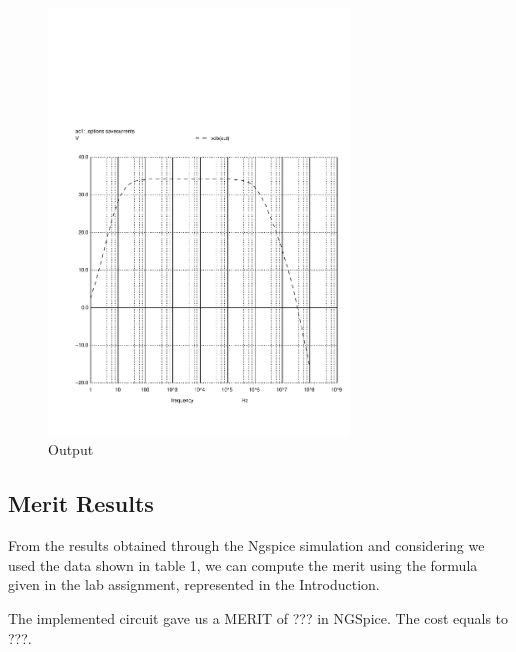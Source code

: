 \begin{figure}[H] 
\centering
\includegraphics[width = 8cm]{vo2f.pdf} 
\caption{Output}
\label{vo2f}
\end{figure}

\subsection{Merit Results}

From the results obtained through the Ngspice simulation and considering we used the data shown in table 1, we can compute the merit using the formula given in the lab assignment, represented in the Introduction.

The implemented circuit gave us a MERIT of ??? in NGSpice.
The cost equals to ???.

%



